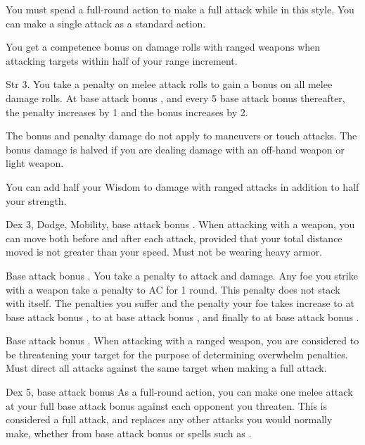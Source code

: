 You must spend a full-round action to make a full attack while in this style. You can make a single attack as a standard action.

 You get a  competence bonus on damage rolls with ranged weapons when attacking targets within half of your range increment. \babscalingdescription

 Str 3.
 You take a  penalty on melee attack rolls to gain a  bonus on all melee damage rolls. At base attack bonus , and every 5 base attack bonus thereafter, the penalty increases by 1 and the bonus increases by 2.
\par The bonus and penalty damage do not apply to maneuvers or touch attacks. The bonus damage is halved if you are dealing damage with an off-hand weapon or light weapon.

 You can add half your Wisdom to damage with ranged attacks in addition to half your strength.

 Dex 3, Dodge, Mobility, base attack bonus .
 When attacking with a weapon, you can move both before and after each attack, provided that your total distance moved is not greater than your speed.
 Must not be wearing heavy armor.

\featpre Base attack bonus .
 You take a  penalty to attack and damage. Any foe you strike with a weapon take a  penalty to AC for 1 round. This penalty does not stack with itself. The penalties you suffer and the penalty your foe takes increase to  at base attack bonus , to  at base attack bonus , and finally to  at base attack bonus .

 Base attack bonus .
 When attacking with a ranged weapon, you are considered to be threatening your target for the purpose of determining overwhelm penalties.
 Must direct all attacks against the same target when making a full attack.

 Dex 5, base attack bonus 
 As a full-round action, you can make one melee attack at your full base attack bonus against each opponent you threaten. This is considered a full attack, and replaces any other attacks you would normally make, whether from base attack bonus or spells such as .

